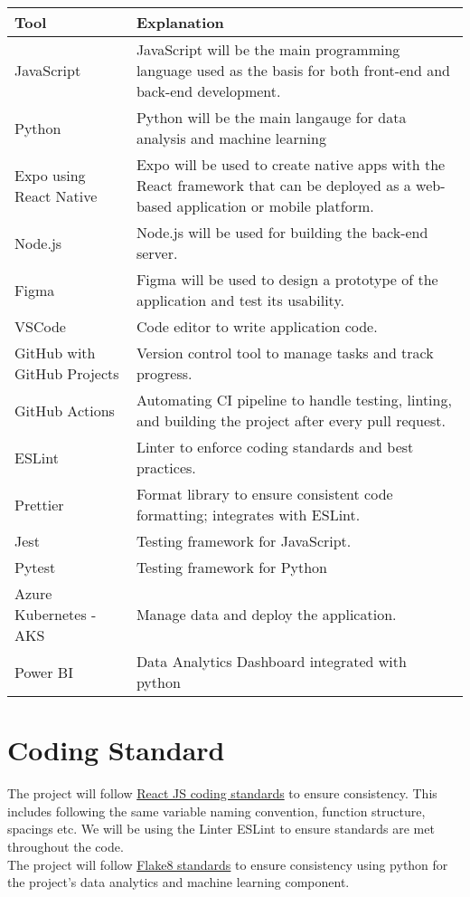\documentclass{article}
\begin{document}
\begin{tabularx}{\textwidth}{|X|X|}
  \hline
  \textbf{Tool} & \textbf{Explanation} \\
  \hline
  JavaScript & JavaScript will be the main programming language used as the basis for both front-end and back-end development.\\
  \hline
  Python & Python will be the main langauge for data analysis and machine learning \\ 
  \hline
  Expo using React Native & Expo will be used to create native apps with the React framework that can be deployed as a web-based application or mobile platform. \\
  \hline
  Node.js & Node.js will be used for building the back-end server. \\
  \hline
  Figma & Figma will be used to design a prototype of the application and test its usability. \\
  \hline
  VSCode & Code editor to write application code. \\
  \hline
  GitHub with GitHub Projects & Version control tool to manage tasks and track progress. \\
  \hline
  GitHub Actions & Automating CI pipeline to handle testing, linting, and building the project after every pull request. \\
  \hline
  ESLint & Linter to enforce coding standards and best practices. \\
  \hline
  Prettier & Format library to ensure consistent code formatting; integrates with ESLint. \\
  \hline
  Jest & Testing framework for JavaScript. \\
  \hline
  Pytest & Testing framework for Python \\ 
  \hline
  Azure Kubernetes - AKS & Manage data and deploy the application. \\
  \hline
  Power BI &  Data Analytics Dashboard integrated with python \\
  \hline
\end{tabularx}

\pagebreak

\section{Coding Standard}

The project will follow \href{https://github.com/pillarstudio/standards/blob/master/reactjs-guidelines.md}{React JS coding standards} to ensure consistency. This includes following the same variable naming convention, function structure, spacings etc. We will be using the Linter ESLint to ensure standards are met throughout the code.\\
The project will follow \href{https://flake8.pycqa.org/en/latest/}{Flake8 standards} to ensure consistency using python for the project's data analytics and machine learning component. 
\end{document}
